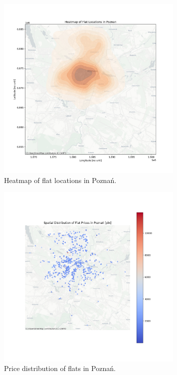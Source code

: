     \begin{figure}[H]
        \centering
        \includegraphics[width=0.8\textwidth]{figures/poznan_heatmap.png}
        \caption{Heatmap of flat locations in Poznań.}
        \label{fig:poznan_heatmap}
    \end{figure}

    \begin{figure}[H]
        \centering
        \includegraphics[width=0.8\textwidth]{figures/poznan_price_distribution.png}
        \caption{Price distribution of flats in Poznań.}
        \label{fig:poznan_price_distribution}
    \end{figure}

